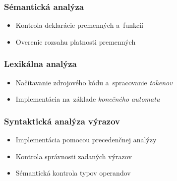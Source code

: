 \documentclass[10pt, hyperref={unicode}, xcolor=pdflatex]{beamer}
\begin{document}
\begin{frame}\frametitle{Sémantická analýza}
    \begin{figure}[h]
    \end{figure}
    \begin{itemize}
        \item Kontrola deklarácie premenných a~funkcií
        \item Overenie rozsahu platnosti premenných
    \end{itemize}
\end{frame}

\begin{frame}\frametitle{Lexikálna analýza}
    \begin{figure}[h]
    \end{figure}
    \begin{itemize}
        \item Načítavanie zdrojového kódu a~spracovanie \emph{tokenov}
        \item Implementácia na~základe \emph{konečného automatu}
    \end{itemize}
\end{frame}

\begin{frame}\frametitle{Syntaktická analýza výrazov}
    \begin{figure}[h]
    \end{figure}
    \begin{itemize}
        \item Implementácia pomocou precedenčnej analýzy
        \item Kontrola správnosti zadaných výrazov
        \item Sémantická kontrola typov operandov
    \end{itemize}
\end{frame}
\end{document}
